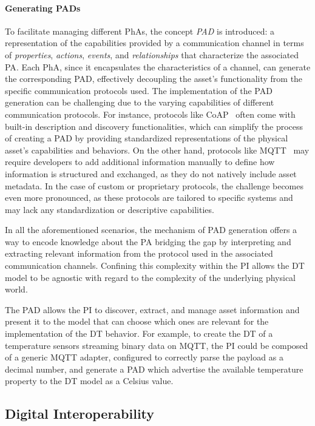 \paragraph{Generating \aclp{PAD}}
To facilitate managing different \acp{PhA}, the concept \emph{\ac{PAD}} is introduced: a representation of the capabilities provided by a communication channel in terms of \emph{properties}, \emph{actions}, \emph{events}, and \emph{relationships} that characterize the associated \ac{PA}.
%
Each \ac{PhA}, since it encapsulates the characteristics of a channel, can generate the corresponding \ac{PAD}, effectively decoupling the asset's functionality from the specific communication protocols used.
%
The implementation of the \ac{PAD} generation can be challenging due to the varying capabilities of different communication protocols.
For instance, protocols like \ac{CoAP}~\cite{RFC7252} often come with built-in description and discovery functionalities, which can simplify the process of creating a \ac{PAD} by providing standardized representations of the physical asset's capabilities and behaviors.
On the other hand, protocols like \ac{MQTT}~\cite{MQTTv5} may require developers to add additional information manually to define how information is structured and exchanged, as they do not natively include asset metadata.
In the case of custom or proprietary protocols, the challenge becomes even more pronounced, as these protocols are tailored to specific systems and may lack any standardization or descriptive capabilities.

In all the aforementioned scenarios, the mechanism of \ac{PAD} generation offers a way to encode knowledge about the \ac{PA} bridging the gap by interpreting and extracting relevant information from the protocol used in the associated communication channels.
%
Confining this complexity within the \ac{PI} allows the \ac{DT} model to be agnostic with regard to the complexity of the underlying physical world.

The \ac{PAD} allows the \ac{PI} to discover, extract, and manage asset information and present it to the model that can choose which ones are relevant for the implementation of the \ac{DT} behavior.
%
For example, to create the \ac{DT} of a temperature sensors streaming binary data on MQTT, the \ac{PI} could be composed of a generic MQTT adapter, configured to correctly parse the payload as a decimal number, and generate a \ac{PAD} which advertise the available temperature property to the \ac{DT} model as a Celsius value. 


\subsection{Digital Interoperability}
\label{sec:digital_interoperability}

